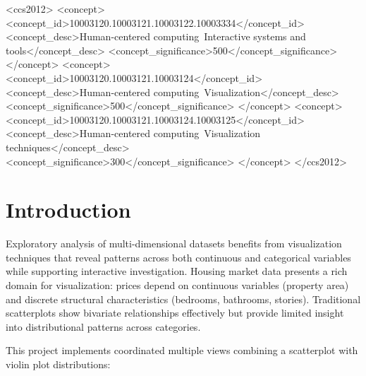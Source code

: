\documentclass[sigplan,screen]{acmart}
\begin{document}
\begin{CCSXML}
<ccs2012>
   <concept>
       <concept_id>10003120.10003121.10003122.10003334</concept_id>
       <concept_desc>Human-centered computing~Interactive systems and 
       tools</concept_desc>
       <concept_significance>500</concept_significance>
   </concept>
   <concept>
       <concept_id>10003120.10003121.10003124</concept_id>
       <concept_desc>Human-centered computing~Visualization</concept_desc>
       <concept_significance>500</concept_significance>
   </concept>
   <concept>
       <concept_id>10003120.10003121.10003124.10003125</concept_id>
       <concept_desc>Human-centered computing~Visualization 
       techniques</concept_desc>
       <concept_significance>300</concept_significance>
   </concept>
 </ccs2012>
\end{CCSXML}

\maketitle

\section{Introduction}

Exploratory analysis of multi-dimensional datasets benefits from
visualization techniques that reveal patterns across both continuous
and categorical variables while supporting interactive investigation.
Housing market data presents a rich domain for visualization: prices
depend on continuous variables (property area) and discrete structural
characteristics (bedrooms, bathrooms, stories). Traditional scatterplots
show bivariate relationships effectively but provide limited insight
into distributional patterns across categories.

This project implements coordinated multiple views combining a
scatterplot with violin plot distributions:
\end{document}
